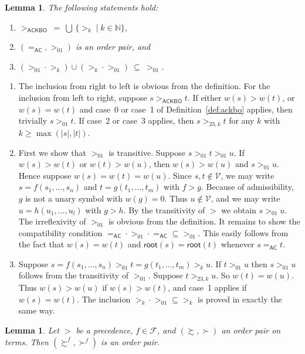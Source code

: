 \documentclass{tlp}
\newcommand{\qed}{\hspace*{1em}\hbox{\proofbox}}
\newtheorem{lemma}[theorem]{Lemma}
\newcommand{\m}[1]{\mathsf{#1}}
\newcommand{\mc}[1]{\mathcal{#1}}
\newcommand{\mr}[1]{\mathrm{#1}}
\newcommand{\rt}{\m{root}}
\newcommand{\FF}{\mc{F}}
\newcommand{\VV}{\mc{V}}
\newcommand{\AC}{\mr{\m{AC}}}
\newcommand{\ackbo}{\mr{\m{ACKBO}}}
\newcommand{\seq}[2][n]{{#2_1},\dots,{#2_{#1}}}
\newcommand{\Nat}{\mathbb{N}}
\newcommand{\GT}{\mathrel{\succ}}
\newcommand{\GS}{\mathrel{\succsim}}
\begin{document}
\begin{lemma}
\label{lem:suborders}
The following statements hold:
\begin{enumerate}
\item
${>_\ackbo} \:=\: \bigcup\,\{ {>_k} \mid k \in \Nat \}$,
\item
$({=_\AC}, {>_{01}})$ is an order pair, and
\item
$({>_{01} \cdot >_k}) \cup ({>_k \cdot >_{01}})
\:\subseteq\: {>_{01}}$.
\end{enumerate}
\end{lemma}
\begin{proof*}
\begin{enumerate}
\item
The inclusion from right to left is obvious from the definition.
For the inclusion from left to right, suppose $s >_\ackbo t$.
If either $w(s) > w(t)$, or $w(s) = w(t)$ and case~0 or case~1 of
Definition~\ref{def:ackbo} applies,
then trivially $s >_{01} t$.
If case~2 or case~3
applies, then $s >_{23,k} t$ for
any $k$ with $k \geqslant \max(|s|,|t|)$.
\item
\smallskip
First we show that $>_{01}$ is transitive.  Suppose $s >_{01} t >_{01} u$.
If $w(s) > w(t)$ or $w(t) > w(u)$, then $w(s) > w(u)$ and $s >_{01} u$.
Hence suppose $w(s) = w(t) =  w(u)$.  Since $s, t \notin \VV$, we may write
$s = f(\seq{s})$ and $t = g(\seq[m]{t})$ with $f > g$.  Because of
admissibility, $g$ is not a unary symbol with $w(g) = 0$.
Thus $u \notin \VV$, and we may write $u = h(\seq[l]{u})$ with
$g > h$. By the transitivity of $>$ we obtain $s >_{01} u$.
The irreflexivity of $>_{01}$ is obvious from the definition.
It remains to show the compatibility condition
${=_\AC} \cdot {>_{01}} \cdot {=_\AC} \subseteq {>_{01}}$. This easily
follows from the fact that $w(s) = w(t)$ and $\rt(s) = \rt(t)$ whenever
$s =_\AC t$.
\item
\smallskip
Suppose $s = f(\seq{s}) >_{01} t = g(\seq[m]{t}) >_k u$. If
$t >_{01} u$ then $s >_{01} u$ follows from the transitivity of $>_{01}$.
Suppose $t >_{23,k} u$.  So $w(t) = w(u)$.
Thus $w(s) > w(u)$ if $w(s) > w(t)$,
and case~1 applies if $w(s) = w(t)$.
The inclusion ${>_k} \cdot {>_{01}} \subseteq {>_k}$ is proved in
exactly the same way.
\qed
\end{enumerate}
\end{proof*}

\begin{lemma}
\label{lem:f-extension}
Let $>$ be a precedence, $f \in \FF$, and
$({\GS},{\GT})$ an order pair on terms. Then
$({\GS^f},{\GT^f})$ is an order pair.
\end{lemma} 
\end{document}
